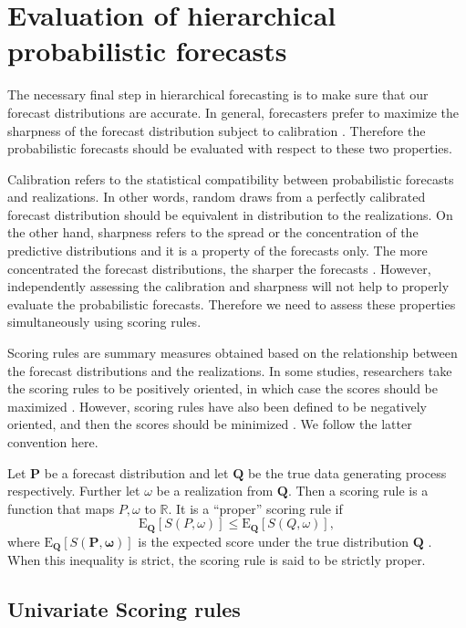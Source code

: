 \documentclass[a4paper, 11pt]{article}
\def\E{\text{E}}
\theoremstyle{theo}
\theoremstyle{definition}
\begin{document}
\section{Evaluation of hierarchical probabilistic forecasts}\label{sec:evaluation}

The necessary final step in hierarchical forecasting is to make sure that our forecast distributions are accurate. In general, forecasters prefer to maximize the sharpness of the forecast distribution subject to calibration \citep{Gneiting2014}. Therefore the probabilistic forecasts should be evaluated with respect to these two properties.

Calibration refers to the statistical compatibility between probabilistic forecasts and realizations. In other words, random draws from a perfectly calibrated forecast distribution should be equivalent in distribution to the realizations. On the other hand, sharpness refers to the spread or the concentration of the predictive distributions and it is a property of the forecasts only. The more concentrated the forecast distributions, the sharper the forecasts \citep{Gneiting2008}. However, independently assessing the calibration and sharpness will not help to properly evaluate the probabilistic forecasts. Therefore we need to assess these properties simultaneously using scoring rules.

Scoring rules are summary measures obtained based on the relationship between the forecast distributions and the realizations. In some studies, researchers take the scoring rules to be positively oriented, in which case the scores should be maximized \citep{Gneiting2007}. However, scoring rules have also been defined to be negatively oriented, and then the scores should be minimized \citep{Gneiting2014}. We follow the latter convention here.

Let $\bm{P}$ be a forecast distribution and let $\bm{Q}$ be the true data generating process respectively. Further let $\omega$ be a realization from $\bm{Q}$. Then a scoring rule is a function that maps $P,\omega$ to $\mathbb{R}$. It is a ``proper'' scoring rule if 
\begin{equation}\label{eq:(3.1.)}
\E_{\bm{Q}}[S(P,\omega)] \le \E_{\bm{Q}}[S(Q,\omega)],
\end{equation}
where $\E_{\bm{Q}}[S(\bm{P,\omega})]$ is the expected score under the true distribution $\bm{Q}$ \citep{Gneiting2008, Gneiting2014}.  When this inequality is strict, the scoring rule is said to be strictly proper.

\subsection{Univariate Scoring rules}
\end{document}
